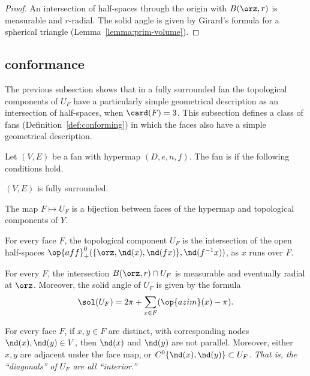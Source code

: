 \begin{proof} An intersection of half-spaces through the origin 
with $B(\orz,r)$ is measurable and
$r$-radial.  The solid angle is given by Girard's formula for
a spherical triangle (Lemma~\ref{lemma:prim-volume}).
\end{proof}
%

\subsection{conformance}


The previous subsection shows that in a fully surrounded fan the topological
components of $U_F$ have a particularly simple geometrical description as
an intersection of half-spaces, when $\card(F)=3$.  This subsection defines
a class of fans (Definition~\ref{def:conforming}) in which the faces also have
a  simple geometrical description.

\begin{definition}[conforming]\label{def:conforming}
Let $(V,E)$ be a fan with hypermap $(D,e,n,f)$.  The fan is
 if the following conditions hold.
\begin{nomerate}
\item {} $(V,E)$ is fully surrounded.
\item {} The map $F\mapsto U_F$ is a bijection between
faces of the hypermap and topological components of $Y$.
\item {} For every face $F$, the topological component
$U_F$ is the intersection of the open half-spaces
$\op{aff}_+^0(\{\orz,\nd(x),\nd({f x})\},\nd(f^{-1} x))$, as $x$ runs over
$F$.
\item {} For every $F$, the intersection
$B(\orz,r)\cap U_F$ is measurable and eventually radial at $\orz$.
Moreover, the solid angle of $U_F$ is given by the formula
\begin{displaymath}
\sol(U_F) = 2\pi + \sum_{x\in F}(\op{azim}(x)-\pi).
\end{displaymath}
\item {} For every face $F$, if $x,y\in F$ are distinct,
with corresponding nodes $\nd(x),\nd(y)\in V$, then $\nd(x)$ and
$\nd(y)$ are not parallel.  Moreover, either $x,y$ are adjacent under
the face map, or $C^0\{\nd(x),\nd(y)\}\subset U_F$.  {\it That is, the
``diagonals'' of $U_F$ are all ``interior.''}
\end{nomerate}
\end{definition}


